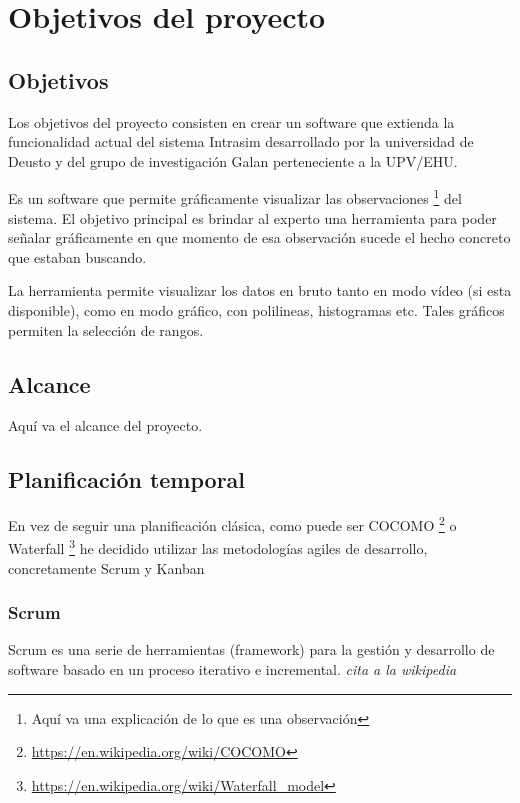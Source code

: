 \chapter{Objetivos del proyecto}

\newpage

\section{Objetivos}
Los objetivos del proyecto consisten en crear un software que extienda la funcionalidad actual del sistema Intrasim desarrollado por la universidad de Deusto y del grupo de investigación Galan perteneciente a la UPV/EHU.

Es un software que permite gráficamente visualizar las observaciones \footnote{Aquí va una explicación de lo que es una observación} del sistema. El objetivo principal es brindar al experto una herramienta para poder señalar gráficamente en que momento de esa observación sucede el hecho concreto que estaban buscando.

La herramienta permite visualizar los datos en bruto tanto en modo vídeo (si esta disponible), como en modo gráfico, con polilineas, histogramas etc. Tales gráficos permiten la selección de rangos.

\section{Alcance}
Aquí va el alcance del proyecto.

\section{Planificaci\'{o}n temporal}
En vez de seguir una planificación clásica, como puede ser COCOMO \footnote{\url{https://en.wikipedia.org/wiki/COCOMO}} o Waterfall \footnote{\url{https://en.wikipedia.org/wiki/Waterfall_model}} he decidido utilizar las metodologías agiles de desarrollo, concretamente Scrum y Kanban

\subsection{Scrum}
Scrum es una serie de herramientas (framework) para la gestión y desarrollo de software basado en un proceso iterativo e incremental. \emph{cita a la wikipedia}

